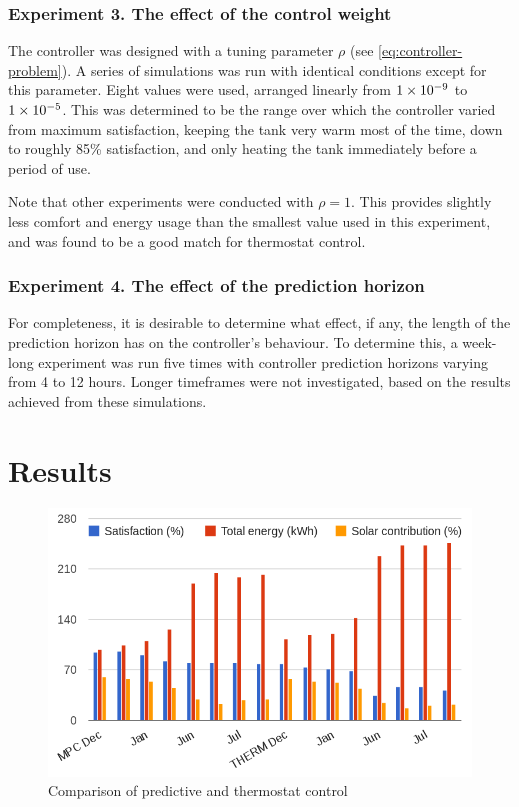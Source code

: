\subsubsection{Experiment 3. The effect of the control weight}

The controller was designed with a tuning parameter $\rho$ (see \autoref{eq:controller-problem}).
A series of simulations was run with identical conditions except for this parameter.
Eight values were used, arranged linearly from $1\times 10^{-9}$ to $1\times 10^{-5}$.
This was determined to be the range over which the controller varied from maximum satisfaction, keeping the tank very warm most of the time, down to roughly 85\% satisfaction, and only heating the tank immediately before a period of use.

Note that other experiments were conducted with $\rho = 1$.
This provides slightly less comfort and energy usage than the smallest value used in this experiment, and was found to be a good match for thermostat control.

\subsubsection{Experiment 4. The effect of the prediction horizon}

For completeness, it is desirable to determine what effect, if any, the length of the prediction horizon has on the controller's behaviour.
To determine this, a week-long experiment was run five times with controller prediction horizons varying from 4 to 12 hours.
Longer timeframes were not investigated, based on the results achieved from these simulations.

\section{Results}

\begin{figure}
   \centering
   \includegraphics[width=\textwidth]{../images/comparison}
   \caption{Comparison of predictive and thermostat control}
   \label{fig:comparison}
\end{figure}


